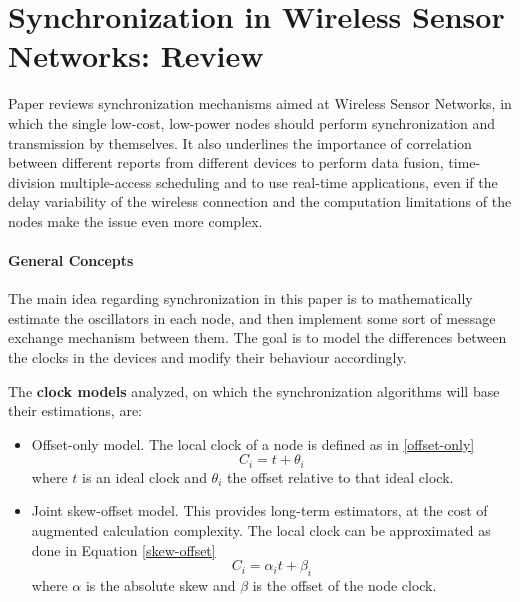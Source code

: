 \section{Synchronization in Wireless Sensor Networks: Review}
Paper \cite{djenouri2014synchronization} reviews synchronization mechanisms aimed at Wireless Sensor Networks, in which the single low-cost, low-power nodes should perform synchronization and transmission by themselves. It also underlines the importance of correlation between different reports from different devices to perform data fusion, time-division multiple-access scheduling and to use real-time applications, even if the delay variability of the wireless connection and the computation limitations of the nodes make the issue even more complex. 

\paragraph{General Concepts} The main idea regarding synchronization in this paper is to mathematically estimate the oscillators in each node, and then implement some sort of message exchange mechanism between them. The goal is to model the differences between the clocks in the devices and modify their behaviour accordingly.

The \textbf{clock models} analyzed, on which the synchronization algorithms will base their estimations, are:
\begin{itemize}
    \item Offset-only model. The local clock of a node is defined as in \ref{offset-only} 
    \begin{equation} \label{offset-only}
        C_i = t + \theta_i 
    \end{equation}
    where \(t\) is an ideal clock and \(\theta_i\) the offset relative to that ideal clock.
    \item Joint skew-offset model. This provides long-term estimators, at the cost of augmented calculation complexity. The local clock can be approximated as done in Equation \ref{skew-offset}
    \begin{equation} \label{skew-offset}
        C_i = \alpha_it + \beta_i 
    \end{equation} 
    where \(\alpha\) is the absolute skew and \(\beta\) is the offset of the node clock. 
\end{itemize}

